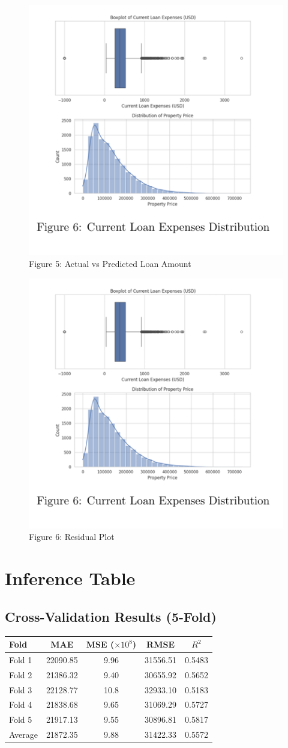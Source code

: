 \documentclass[12pt]{article}
\begin{document}
  \begin{figure}[H]
      \centering
      \includegraphics[width=0.5\linewidth]{image.png}
      \caption{Figure 5: Actual vs Predicted Loan Amount}
      \label{fig:enter-label}
  \end{figure}
  \begin{figure}
      \centering
      \includegraphics[width=0.5\linewidth]{image.png}
      \caption{Figure 6: Residual Plot}
      \label{fig:enter-label}
  \end{figure}
  


\section*{Inference Table}

\subsection*{Cross-Validation Results (5-Fold)}
\begin{tabular}{lcccc}
\toprule
Fold & MAE & MSE ($\times 10^8$) & RMSE & $R^2$ \\
\midrule
Fold 1 & 22090.85 & 9.96 & 31556.51 & 0.5483 \\
Fold 2 & 21386.32 & 9.40 & 30655.92 & 0.5652 \\
Fold 3 & 22128.77 & 10.8 & 32933.10 & 0.5183 \\
Fold 4 & 21838.68 & 9.65 & 31069.29 & 0.5727 \\
Fold 5 & 21917.13 & 9.55 & 30896.81 & 0.5817 \\
\midrule
Average & 21872.35 & 9.88 & 31422.33 & 0.5572 \\
\bottomrule
\end{tabular}
\end{document}
